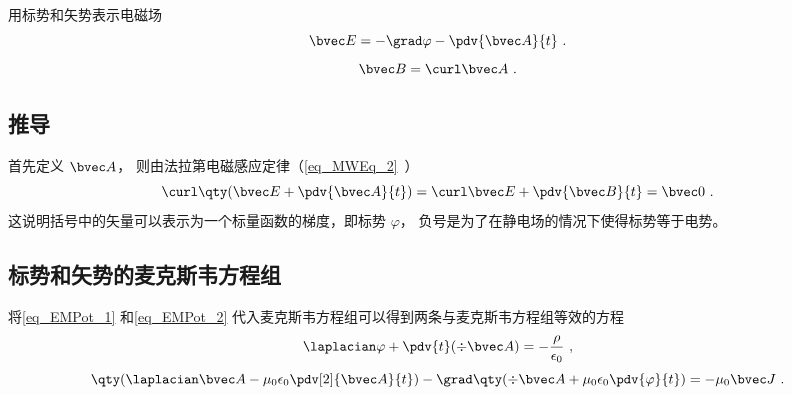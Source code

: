 
\begin{issues}
\issueDraft
\end{issues}


用标势和矢势表示电磁场
\begin{equation}\label{eq_EMPot_1}
\bvec E = -\grad \varphi - \pdv{\bvec A}{t}~.
\end{equation}
\begin{equation}\label{eq_EMPot_2}
\bvec B = \curl \bvec A~.
\end{equation}

\subsection{推导}
首先定义 $\bvec A$， 则由法拉第电磁感应定律（\autoref{eq_MWEq_2}~）
\begin{equation}
\curl \qty(\bvec E + \pdv{\bvec A}{t}) = \curl \bvec E + \pdv{\bvec B}{t} = \bvec 0~.
\end{equation}
这说明括号中的矢量可以表示为一个标量函数的梯度，即标势 $\varphi$， 负号是为了在静电场的情况下使得标势等于电势。

\subsection{标势和矢势的麦克斯韦方程组}

将\autoref{eq_EMPot_1} 和\autoref{eq_EMPot_2} 代入麦克斯韦方程组可以得到两条与麦克斯韦方程组等效的方程
\begin{equation}\label{eq_EMPot_4}
\laplacian \varphi + \pdv{t} (\div \bvec A) = -\frac{\rho}{\epsilon_0}~,
\end{equation}
\begin{equation}\label{eq_EMPot_5}
\qty(\laplacian \bvec A - \mu_0\epsilon_0 \pdv[2]{\bvec A}{t}) - \grad \qty(\div \bvec A + \mu_0\epsilon_0 \pdv{\varphi}{t}) = -\mu_0\bvec J~.
\end{equation}

